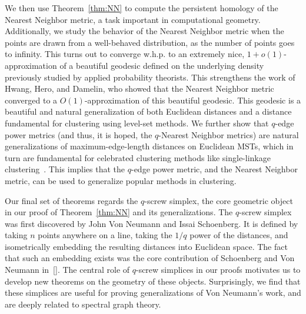  We then use Theorem~\ref{thm:NN} to compute the persistent homology
of the Nearest Neighbor metric, a task important in computational geometry.
Additionally, we study the behavior of the Nearest Neighbor metric when the
points are drawn from a well-behaved distribution, as the number of points
goes to infinity. This turns out to converge w.h.p. to an extremely nice,
$1+o(1)$-approximation of a beautiful geodesic defined on the underlying
density previously studied by applied probability theorists. This
strengthens the work of Hwang, Hero, and Damelin, who showed that the
Nearest Neighbor metric converged to a $O(1)$-approximation of this
beautiful geodesic. This geodesic is a beautiful and natural generalization
of both Euclidean distances and a distance fundamental for clustering using
level-set methods. We further show that $q$-edge power metrics (and thus,
it is hoped, the $q$-Nearest Neighbor metrics) are natural generalizations
of maximum-edge-length distances on Euclidean MSTs, which in turn are
fundamental for celebrated clustering methods like single-linkage
clustering~\cite{}. This implies that the $q$-edge power metric, and the
Nearest Neighbor metric, can be used to generalize popular methods in
clustering.

Our final set of theorems regards the $q$-screw simplex, the core geometric
object in our proof of Theorem~\ref{thm:NN} and its generalizations. The
$q$-screw simplex was first discovered by John Von Neumann and Issai
Schoenberg. It is defined by taking $n$ points anywhere on a line, taking
the $1/q$ power of the distances, and isometrically embedding the resulting
distances into Euclidean space. The fact that such an embedding exists was
the core contribution of Schoenberg and Von Neumann in~\ref{}. The central
role of $q$-screw simplices in our proofs motivates us to develop new
theorems on the geometry of these objects. Surprisingly, we find that these
simplices are useful for proving generalizations of Von Neumann's work, and
are deeply related to spectral graph theory.

